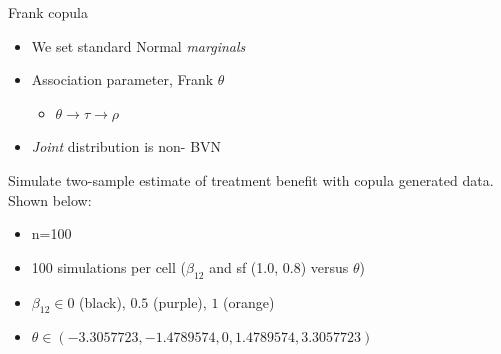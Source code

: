 \documentclass[10pt]{beamer}
\providecommand{\tightlist}{%
\setlength{\itemsep}{0pt}\setlength{\parskip}{0pt}}
\begin{document}
\begin{frame}{Frank copula}
\protect\hypertarget{frank-copula}{}

\begin{itemize}
\tightlist
\item
  We set standard Normal \emph{marginals}
\item
  Association parameter, Frank \(\theta\)

  \begin{itemize}
  \tightlist
  \item
    \(\theta \rightarrow \tau \rightarrow \rho\)
  \end{itemize}
\item
  \emph{Joint} distribution is \alert{non-} BVN
\end{itemize}

Simulate two-sample \alert{estimate of treatment benefit} with copula generated data. Shown below:
\begin{itemize}
  \tightlist
  \item n=100
  \item 100 simulations per cell ($\beta_{12}$ and sf (1.0, 0.8) versus $\theta$)
  \item $\beta_{12} \in 0$ (black), $0.5$ (purple), $1$ (orange)
  \item $\theta \in (-3.3057723, -1.4789574,    0, 1.4789574, 3.3057723)$
\end{itemize}
\end{frame}
\end{document}
